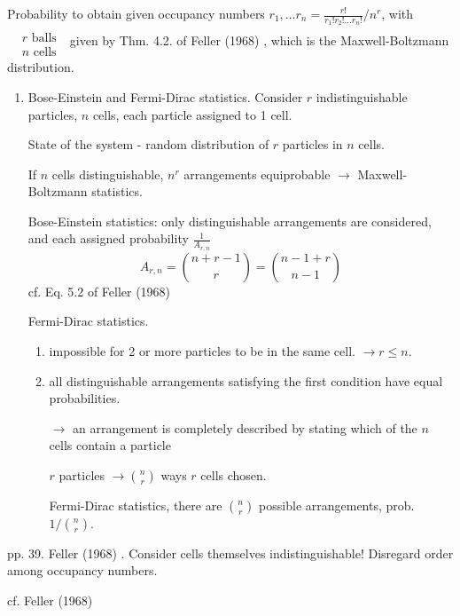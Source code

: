 Probability to obtain given occupancy numbers $r_1,\dots r_n = \frac{r!}{ r_1! r_2! \dots r_n! } / n^r$, with $ \begin{aligned} & \quad \\ 
	& r \text{ balls } \\ 
& n \text{ cells } \end{aligned}$  given by Thm. 4.2. of Feller (1968)  \cite{dgdt:Fell1968}, which is the Maxwell-Boltzmann distribution.  

\begin{enumerate}
\item[(a)] Bose-Einstein and Fermi-Dirac statistics.  Consider $r$ indistinguishable particles, $n$ cells, each particle assigned to 1 cell.  

State of the system - random distribution of $r$ particles in $n$ cells.  

If $n$ cells distinguishable, $n^r$ arrangements equiprobable $\to $ Maxwell-Boltzmann statistics.  

Bose-Einstein statistics: only distinguishable arrangements are considered, and each assigned probability $\frac{1}{A_{r,n}}$  
\begin{equation}
A_{r,n} = \binom{n+r-1}{r} = \binom{n-1+r}{n-1}  
\end{equation}
cf. Eq. 5.2 of Feller (1968)  \cite{dgdt:Fell1968}

Fermi-Dirac statistics.  
\begin{enumerate}
\item[(1)] impossible for 2 or more particles to be in the same cell.  $\to r \leq n$.  
\item[(2)] all distinguishable arrangements satisfying the first condition have equal probabilities.  

$\to$ an arrangement is completely described by stating which of the $n$ cells contain a particle  

$r$ particles $\to \binom{n}{r}$ ways $r$ cells chosen.  

Fermi-Dirac statistics, there are $\binom{n}{r}$ possible arrangements, prob. $1/\binom{n}{r}$.  
\end{enumerate}
\end{enumerate}
pp. 39.  Feller (1968)  \cite{dgdt:Fell1968}.  Consider cells themselves indistinguishable!  Disregard order among occupancy numbers.  








cf. Feller (1968)  \cite{dgdt:Fell1968}

